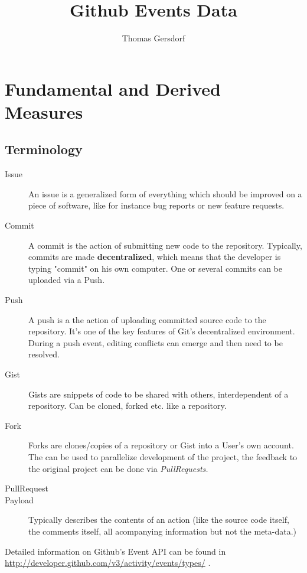 \documentclass[a4paper,10pt]{article}
\title{Github Events Data}
\author{Thomas Gersdorf}
\begin{document}
\maketitle


\section{Fundamental and Derived Measures}
\subsection{Terminology}
\begin{description}
\item[Issue] An issue is a generalized form of everything which should be improved on a piece of software, like for instance bug reports or new feature requests.
\item [Commit] A commit is the action of submitting new code to the repository. Typically, commits are made \textbf{decentralized}, which means that the developer is typing "commit" on his own computer. One or several commits can be uploaded via a Push.
\item [Push ] A push is a the action of uploading committed source code to the repository. It's one of the key features of Git's decentralized environment. During a push event, editing conflicts can emerge and then need to be resolved.
 \item[Gist] Gists are snippets of code to be shared with others, interdependent of a repository. Can be cloned, forked etc. like a repository.
\item [Fork] Forks are clones/copies of a repository or Gist into a User's own account. The can be used to parallelize development of the project, the feedback to the original project can be done via \textit{PullRequests.}
\item [PullRequest] 
\item [Payload] Typically describes the contents of an action (like the source code itself, the comments itself, all acompanying information but not the meta-data.)
\end{description}

Detailed information on Github's Event API can be found in \url{http://developer.github.com/v3/activity/events/types/} .
\end{document}
